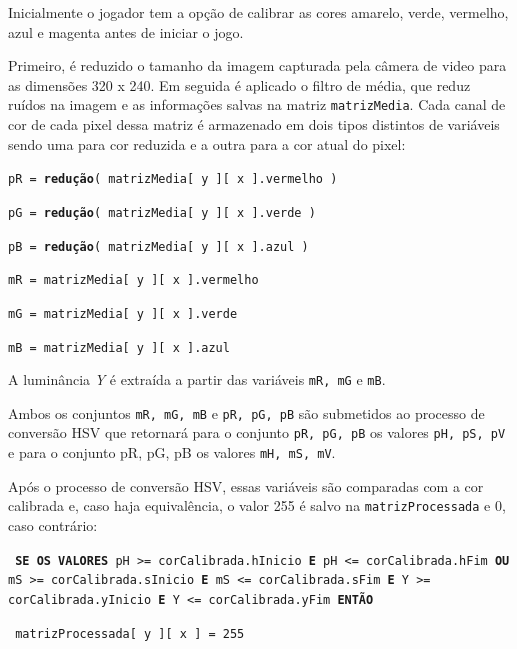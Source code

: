 \documentclass[12pt]{article}
\begin{document}
Inicialmente o jogador tem a op\c c\~ao de calibrar as cores amarelo, verde, vermelho, azul e magenta antes de iniciar o jogo.

Primeiro, \'e reduzido o tamanho da imagem capturada pela c\^amera de video para as dimens\~oes 320 x 240.
Em seguida \'e aplicado o filtro de m\'edia, que reduz ru\'idos na imagem e as informa\c c\~oes salvas na matriz \texttt{matrizMedia}.
Cada canal de cor de cada pixel dessa matriz \'e armazenado em dois tipos distintos de vari\'aveis sendo uma para cor reduzida
e a outra para a cor atual do pixel:

\texttt{\footnotesize{pR = \textbf{redu\c c\~ao}( matrizMedia[ y ][ x ].vermelho )}}

\texttt{\footnotesize{pG = \textbf{redu\c c\~ao}( matrizMedia[ y ][ x ].verde )}}

\texttt{\footnotesize{pB = \textbf{redu\c c\~ao}( matrizMedia[ y ][ x ].azul )}}

\vspace{0.5cm}

\texttt{\footnotesize{mR = matrizMedia[ y ][ x ].vermelho}}

\texttt{\footnotesize{mG = matrizMedia[ y ][ x ].verde}}

\texttt{\footnotesize{mB = matrizMedia[ y ][ x ].azul}}


A lumin\^ancia \emph{Y} \'e extra\'ida a partir das vari\'aveis \texttt{mR, mG} e \texttt{mB}.

Ambos os conjuntos \texttt{mR, mG, mB} e \texttt{pR, pG, pB} s\~ao submetidos ao processo de convers\~ao HSV que retornar\'a
para o conjunto \texttt{pR, pG, pB} os valores \texttt{pH, pS, pV} e para o conjunto {pR, pG, pB} os valores \texttt{mH, mS, mV}.

Ap\'os o processo de convers\~ao HSV, essas vari\'aveis s\~ao comparadas com a cor calibrada e, caso haja equival\^encia,
o valor 255 \'e salvo na \texttt{matrizProcessada} e 0, caso contr\'ario:

\noindent \texttt{\footnotesize{ \textbf{SE OS VALORES}} {pH >= corCalibrada.hInicio}
 \footnotesize{\textbf{E}} \footnotesize{pH <= corCalibrada.hFim} \footnotesize{\textbf{OU}}
  \footnotesize{mS >= corCalibrada.sInicio} \footnotesize{\textbf{E}} \footnotesize{mS <= corCalibrada.sFim}
   \footnotesize{\textbf{E}} \footnotesize{Y >= corCalibrada.yInicio} \footnotesize{\textbf{E}}
    \footnotesize{Y <= corCalibrada.yFim} {\textbf{ENT\~AO}}}

\hspace{0.3cm} \texttt{\footnotesize{ matrizProcessada[ y ][ x ] = 255}}
\end{document}
